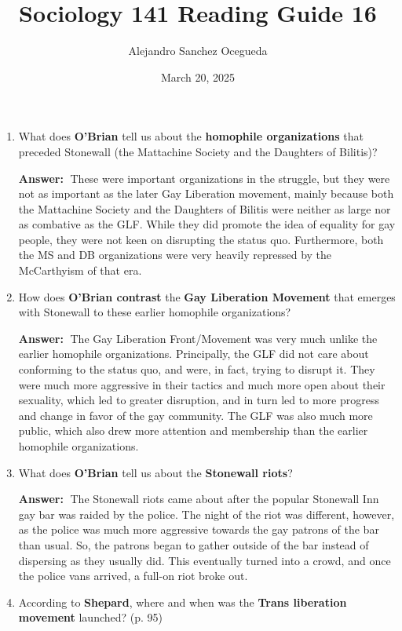 \documentclass{article}
\title{Sociology 141 Reading Guide 16}
\author{Alejandro Sanchez Ocegueda}
\date{March 20, 2025}
\newcommand{\answer}{\textbf{Answer:}$\;$}
\begin{document}
\maketitle

\begin{enumerate}[label=\arabic*)]
    \item What does \textbf{O'Brian} tell us about the \textbf{homophile organizations} that preceded Stonewall (the Mattachine Society and the Daughters of Bilitis)?
    
    \answer 
    These were important organizations in the struggle, but they were not as important as the later Gay Liberation movement, mainly because both the Mattachine Society and the Daughters of Bilitis were neither as large nor as combative as the GLF.
    While they did promote the idea of equality for gay people, they were not keen on disrupting the status quo.
    Furthermore, both the MS and DB organizations were very heavily repressed by the McCarthyism of that era.


    
    \item How does \textbf{O'Brian contrast} the \textbf{Gay Liberation Movement} that emerges with Stonewall to these earlier homophile organizations?
    
    \answer 
    The Gay Liberation Front/Movement was very much unlike the earlier homophile organizations.
    Principally, the GLF did not care about conforming to the status quo, and were, in fact, trying to disrupt it.
    They were much more aggressive in their tactics and much more open about their sexuality, which led to greater disruption, and in turn led to more progress and change in favor of the gay community.
    The GLF was also much more public, which also drew more attention and membership than the earlier homophile organizations.

    \item What does \textbf{O'Brian} tell us about the \textbf{Stonewall riots}?

    \answer
    The Stonewall riots came about after the popular Stonewall Inn gay bar was raided by the police.
    The night of the riot was different, however, as the police was much more aggressive towards the gay patrons of the bar than usual.
    So, the patrons began to gather outside of the bar instead of dispersing as they usually did.
    This eventually turned into a crowd, and once the police vans arrived, a full-on riot broke out.
    
    
    \item According to \textbf{Shepard}, where and when was the \textbf{Trans liberation movement} launched? (p. 95)
   


\end{enumerate}
\end{document}
